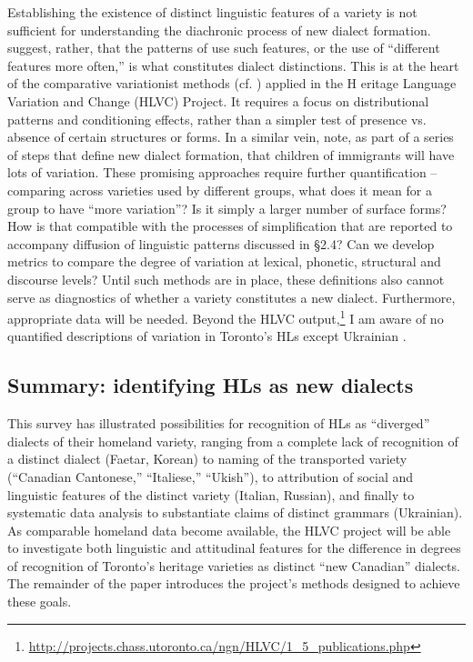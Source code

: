 \documentclass[output=paper]{LSP/langsci}
\begin{document}
Establishing the existence of distinct linguistic features of a variety is not sufficient for understanding the diachronic process of new dialect formation. \citet[6]{auer_study_2004} suggest, rather, that the patterns of use such features, or the use of “different features more often,” is what constitutes dialect distinctions. This is at the heart of the comparative variationist methods (cf. \citealt{cacoullos_testing_2010}) applied in the H
eritage Language Variation and Change (HLVC) Project. It requires a focus on distributional patterns and conditioning effects, rather than a simpler test of presence vs. absence of certain structures or forms. In a similar vein, \citet[215]{auer_birth_2004} note, as part of a series of steps that define new dialect formation, that children of immigrants will have lots of variation. These promising approaches require further quantification – comparing across varieties used by different groups, what does it mean for a group to have “more variation”? Is it simply a larger number of surface forms? How is that compatible with the processes of simplification that are reported to accompany diffusion of linguistic patterns discussed in §2.4? Can we develop metrics to compare the degree of variation at lexical, phonetic, structural and discourse levels? Until such methods are in place, these definitions also cannot serve as diagnostics of whether a variety constitutes a new dialect. Furthermore, appropriate data will be needed. Beyond the HLVC output,\footnote{\url{http://projects.chass.utoronto.ca/ngn/HLVC/1_5_publications.php}} I am aware of no quantified descriptions of variation in Toronto’s HLs except Ukrainian \citep{budzhak-jones_variable_1994,chumak-horbatsch_language_1987}. 

\subsection{Summary: identifying HLs as new dialects}

This survey has illustrated possibilities for recognition of HLs as “diverged” dialects of their homeland variety, ranging from a complete lack of recognition of a distinct dialect (Faetar, Korean) to naming of the transported variety (“Canadian Cantonese,” “Italiese,” “Ukish”), to attribution of social and linguistic features of the distinct variety (Italian, Russian), and finally to systematic data analysis to substantiate claims of distinct grammars (Ukrainian). As comparable homeland data become available, the HLVC project will be able to investigate both linguistic and attitudinal features for the difference in degrees of recognition of Toronto’s heritage varieties as distinct “new Canadian” dialects. The remainder of the paper introduces the project’s methods designed to achieve these goals.
\end{document}
